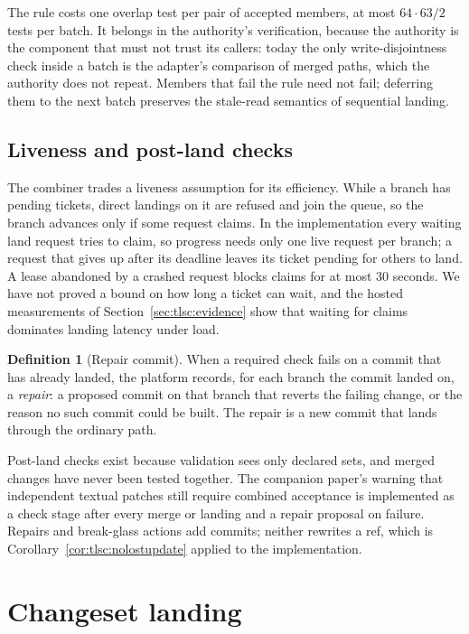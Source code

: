 \documentclass[11pt,letterpaper]{article}
\theoremstyle{definition}
\newtheorem{definition}[theorem]{Definition}
\theoremstyle{remark}
\begin{document}
The rule costs one overlap test per pair of accepted members, at most $64\cdot 63/2$ tests per batch. %
It belongs in the authority's verification, because the authority is the component that must not trust its callers: today the only write-disjointness check inside a batch is the adapter's comparison of merged paths, which the authority does not repeat. Members that fail the rule need not fail; deferring them to the next batch preserves the stale-read semantics of sequential landing.

\subsection{Liveness and post-land checks}

The combiner trades a liveness assumption for its efficiency. While a branch has pending tickets, direct landings on it are refused and join the queue, so the branch advances only if some request claims. In the implementation every waiting land request tries to claim, so progress needs only one live request per branch; a request that gives up after its deadline leaves its ticket pending for others to land. A lease abandoned by a crashed request blocks claims for at most 30 seconds. %
We have not proved a bound on how long a ticket can wait, and the hosted measurements of Section~\ref{sec:tlsc:evidence} show that waiting for claims dominates landing latency under load.

\begin{definition}[Repair commit]
\label{def:tlsc:repair}
When a required check fails on a commit that has already landed, the platform records, for each branch the commit landed on, a \emph{repair}: a proposed commit on that branch that reverts the failing change, or the reason no such commit could be built. The repair is a new commit that lands through the ordinary path.
\end{definition}

Post-land checks exist because validation sees only declared sets, and merged changes have never been tested together. The companion paper's warning that independent textual patches still require combined acceptance \cite{long2026inversion} is implemented as a check stage after every merge or landing and a repair proposal on failure. Repairs and break-glass actions add commits; neither rewrites a ref, which is Corollary~\ref{cor:tlsc:nolostupdate} applied to the implementation.

\section{Changeset landing}
\label{sec:tlsc:n11proof}
\end{document}
